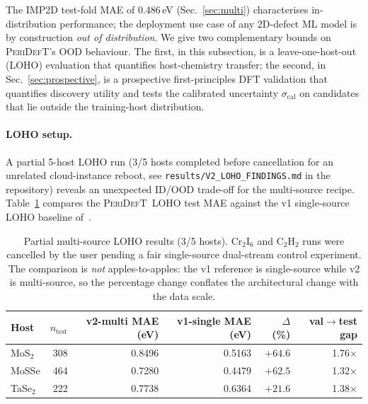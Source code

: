 \documentclass[11pt,a4paper]{article}
\newcommand{\modelname}{\textsc{PeriDefT}}
\begin{document}
The IMP2D test-fold MAE of 0.486\,eV (Sec.~\ref{sec:multi})
characterises in-distribution performance; the deployment use case
of any 2D-defect ML model is by construction \emph{out of
distribution}. We give two complementary bounds on \modelname's OOD
behaviour. The first, in this subsection, is a leave-one-host-out
(LOHO) evaluation that quantifies host-chemistry transfer; the
second, in Sec.~\ref{sec:prospective}, is a prospective
first-principles DFT validation that quantifies discovery utility
and tests the calibrated uncertainty $\sigma_{\mathrm{cal}}$ on
candidates that lie outside the training-host distribution.

\paragraph{LOHO setup.}

A partial 5-host LOHO run (3/5 hosts completed before cancellation
for an unrelated cloud-instance reboot, see
\texttt{results/V2\_LOHO\_FINDINGS.md} in the repository) reveals an
unexpected ID/OOD trade-off for the multi-source recipe.
Table~\ref{tab:loho} compares the \modelname\ LOHO test MAE
against the v1 single-source LOHO baseline of~\cite{ourPaperV12}.

\begin{table}[h]
\centering
\caption{Partial multi-source LOHO results (3/5 hosts).
Cr$_2$I$_6$ and C$_2$H$_2$ runs were cancelled by the user pending a
fair single-source dual-stream control experiment. The comparison
is \emph{not} apples-to-apples: the v1 reference is single-source
while v2 is multi-source, so the percentage change conflates the
architectural change with the data scale.}
\label{tab:loho}
\begin{tabular}{lrrrrr}
\toprule
Host & $n_{\mathrm{test}}$ & v2-multi MAE (eV) &
v1-single MAE (eV) & $\Delta$ (\%) & val$\to$test gap \\
\midrule
MoS$_2$  & 308 & 0.8496 & 0.5163 & $+64.6$ & 1.76$\times$ \\
MoSSe    & 464 & 0.7280 & 0.4479 & $+62.5$ & 1.32$\times$ \\
TaSe$_2$ & 222 & 0.7738 & 0.6364 & $+21.6$ & 1.38$\times$ \\
\bottomrule
\end{tabular}
\end{table}
\end{document}
